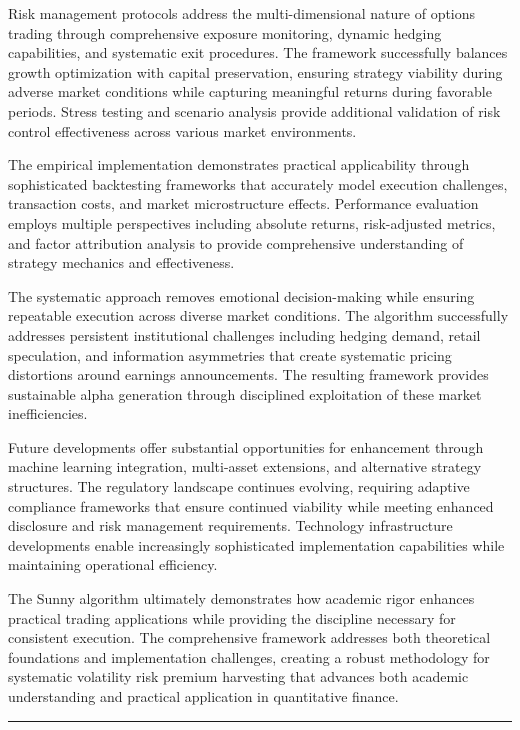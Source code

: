 \documentclass[
  american,
  11pt,
  11pt,
  letterpaper,
  onecolumn]{article}
\begin{document}
Risk management protocols address the multi-dimensional nature of
options trading through comprehensive exposure monitoring, dynamic
hedging capabilities, and systematic exit procedures. The framework
successfully balances growth optimization with capital preservation,
ensuring strategy viability during adverse market conditions while
capturing meaningful returns during favorable periods. Stress testing
and scenario analysis provide additional validation of risk control
effectiveness across various market environments.

The empirical implementation demonstrates practical applicability
through sophisticated backtesting frameworks that accurately model
execution challenges, transaction costs, and market microstructure
effects. Performance evaluation employs multiple perspectives including
absolute returns, risk-adjusted metrics, and factor attribution analysis
to provide comprehensive understanding of strategy mechanics and
effectiveness.

The systematic approach removes emotional decision-making while ensuring
repeatable execution across diverse market conditions. The algorithm
successfully addresses persistent institutional challenges including
hedging demand, retail speculation, and information asymmetries that
create systematic pricing distortions around earnings announcements. The
resulting framework provides sustainable alpha generation through
disciplined exploitation of these market inefficiencies.

Future developments offer substantial opportunities for enhancement
through machine learning integration, multi-asset extensions, and
alternative strategy structures. The regulatory landscape continues
evolving, requiring adaptive compliance frameworks that ensure continued
viability while meeting enhanced disclosure and risk management
requirements. Technology infrastructure developments enable increasingly
sophisticated implementation capabilities while maintaining operational
efficiency.

The Sunny algorithm ultimately demonstrates how academic rigor enhances
practical trading applications while providing the discipline necessary
for consistent execution. The comprehensive framework addresses both
theoretical foundations and implementation challenges, creating a robust
methodology for systematic volatility risk premium harvesting that
advances both academic understanding and practical application in
quantitative finance.

\begin{center}\rule{0.5\linewidth}{0.5pt}\end{center}
\end{document}
